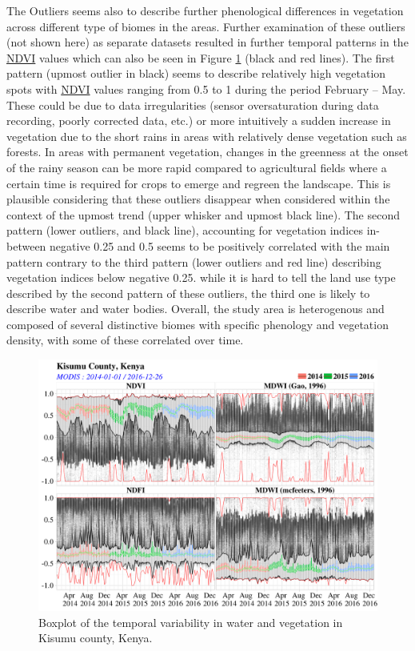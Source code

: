 \documentclass[12pt,oneside]{article}
\begin{document}
The Outliers seems also to describe further phenological differences in vegetation across different type of biomes in the areas. Further examination of these outliers (not shown here) as separate datasets resulted in further temporal patterns in the \href{https://www.sciencedirect.com/science/article/pii/0034425779900130?via\%3Dihub}{NDVI} values which can also be seen in Figure \ref{fig:fig5} (black and red lines). The first pattern (upmost outlier in black) seems to describe relatively high vegetation spots with \href{https://www.sciencedirect.com/science/article/pii/0034425779900130?via\%3Dihub}{NDVI} values ranging from 0.5 to 1 during the period February -- May. These could be due to data irregularities (sensor oversaturation during data recording, poorly corrected data, etc.) or more intuitively a sudden increase in vegetation due to the short rains in areas with relatively dense vegetation such as forests. In areas with permanent vegetation, changes in the greenness at the onset of the rainy season can be more rapid compared to agricultural fields where a certain time is required for crops to emerge and regreen the landscape. This is plausible considering that these outliers disappear when considered within the context of the upmost trend (upper whisker and upmost black line). The second pattern (lower outliers, and black line), accounting for vegetation indices in-between negative 0.25 and 0.5 seems to be positively correlated with the main pattern contrary to the third pattern (lower outliers and red line) describing vegetation indices below negative 0.25. while it is hard to tell the land use type described by the second pattern of these outliers, the third one is likely to describe water and water bodies. Overall, the study area is heterogenous and composed of several distinctive biomes with specific phenology and vegetation density, with some of these correlated over time.

\begin{figure}
\includegraphics[width=1\linewidth]{figures/Mapping_FBFS_boxplot_temporal_variability} \caption{Boxplot of the temporal variability in water and vegetation in Kisumu county, Kenya.}\label{fig:fig5}
\end{figure}
\end{document}
